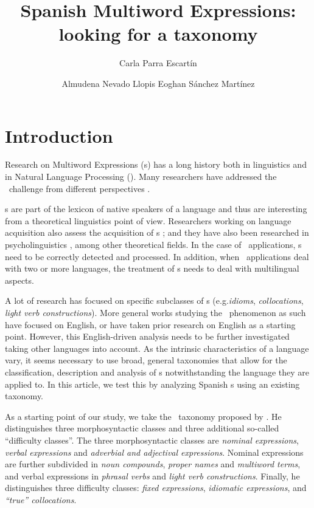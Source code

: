 \documentclass[output=paper]{langsci/langscibook}
\author{Carla Parra Escartín\affiliation{ADAPT Centre, SALIS/CTTS, Dublin City University}%
\and Almudena Nevado Llopis\affiliation{San Jorge University}%
\lastand Eoghan Sánchez Martínez\affiliation{San Jorge University}}
\title{Spanish Multiword Expressions: 
looking for a taxonomy}
\begin{document}
\section{Introduction}

Research on Multiword Expressions (\mwe s) has a long history both in linguistics and in Natural Language Processing (\nlp). 
Many researchers have addressed the \mwe\ challenge from different perspectives \citep{Melcuk:1987,Church:1990,Sinclair:1991,smadja1993,moon1998,Lin:1999}.

\mwe s are part of the lexicon of native speakers of a language and thus are interesting from a theoretical linguistics point of view. 
Researchers working on language acquisition also assess the acquisition of \mwe s \citep{Devereux:2007,Villavicencio:2012,Nematzadeh:2013}; and they have also been researched in psycholinguistics \citep{Rapp:2008,Holsinger:2013a,Holsinger:2013b,Schulteimwalde:2015}, among other theoretical fields. 
In the case of \nlp\ applications, \mwe s need to be correctly detected and processed. 
In addition, when \nlp\ applications deal with two or more languages, the treatment of \mwe s needs to deal with multilingual aspects.

A lot of research has focused on specific subclasses of \mwe s (e.g.\@ \textit{idioms}, \textit{collocations}, \textit{light verb constructions}).
More general works studying the \mwe\ phenomenon as such have focused on English, or have taken prior research on English as a starting point. 
However, this English-driven analysis needs to be further investigated taking other languages into account. 
As the intrinsic characteristics of a language vary, it seems necessary to use broad, general taxonomies that allow for the classification, description and analysis of \mwe s notwithstanding the language they are applied to.
In this article, we test this by analyzing Spanish \mwe s using an existing taxonomy.

As a starting point of our study, we take the \mwe\ taxonomy proposed by \citet{Ramisch:2012,Ramisch:2015}. He distinguishes three morphosyntactic classes and three additional so-called ``difficulty classes''. 
The three morphosyntactic classes are \textit{nominal expressions}, \textit{verbal expressions} and \textit{adverbial and adjectival expressions}. 
Nominal expressions are further subdivided in \textit{noun compounds}, \textit{proper names} and \textit{multiword terms}, and verbal expressions in \textit{phrasal verbs} and \textit{light verb constructions}. 
Finally, he distinguishes three difficulty classes: \textit{fixed expressions}, \textit{idiomatic expressions}, and \textit{``true'' collocations}. 
\end{document}
